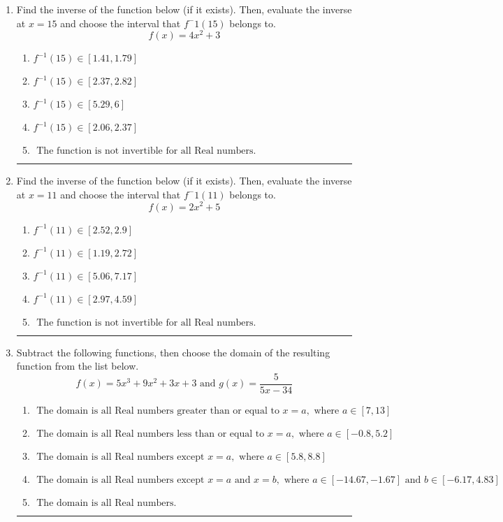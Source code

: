 \documentclass[14pt]{extbook}
\newcommand{\litem}[1]{\item#1\hspace*{-1cm}\rule{\textwidth}{0.4pt}}
\begin{document}
\begin{enumerate}
{\begin{enumerate}[label=\Alph*.]
\end{enumerate} }
\litem{
Find the inverse of the function below (if it exists). Then, evaluate the inverse at $x = 15$ and choose the interval that $f^-1(15)$ belongs to.\[ f(x) = 4 x^2 + 3 \]\begin{enumerate}[label=\Alph*.]
\item \( f^{-1}(15) \in [1.41, 1.79] \)
\item \( f^{-1}(15) \in [2.37, 2.82] \)
\item \( f^{-1}(15) \in [5.29, 6] \)
\item \( f^{-1}(15) \in [2.06, 2.37] \)
\item \( \text{ The function is not invertible for all Real numbers. } \)

\end{enumerate} }
\litem{
Find the inverse of the function below (if it exists). Then, evaluate the inverse at $x = 11$ and choose the interval that $f^-1(11)$ belongs to.\[ f(x) = 2 x^2 + 5 \]\begin{enumerate}[label=\Alph*.]
\item \( f^{-1}(11) \in [2.52, 2.9] \)
\item \( f^{-1}(11) \in [1.19, 2.72] \)
\item \( f^{-1}(11) \in [5.06, 7.17] \)
\item \( f^{-1}(11) \in [2.97, 4.59] \)
\item \( \text{ The function is not invertible for all Real numbers. } \)

\end{enumerate} }
\litem{
Subtract the following functions, then choose the domain of the resulting function from the list below.\[ f(x) = 5x^{3} +9 x^{2} +3 x + 3 \text{ and } g(x) = \frac{5}{5x-34} \]\begin{enumerate}[label=\Alph*.]
\item \( \text{ The domain is all Real numbers greater than or equal to } x = a, \text{ where } a \in [7, 13] \)
\item \( \text{ The domain is all Real numbers less than or equal to } x = a, \text{ where } a \in [-0.8, 5.2] \)
\item \( \text{ The domain is all Real numbers except } x = a, \text{ where } a \in [5.8, 8.8] \)
\item \( \text{ The domain is all Real numbers except } x = a \text{ and } x = b, \text{ where } a \in [-14.67, -1.67] \text{ and } b \in [-6.17, 4.83] \)
\item \( \text{ The domain is all Real numbers. } \)


\end{enumerate}}
\end{enumerate}
\end{document}
